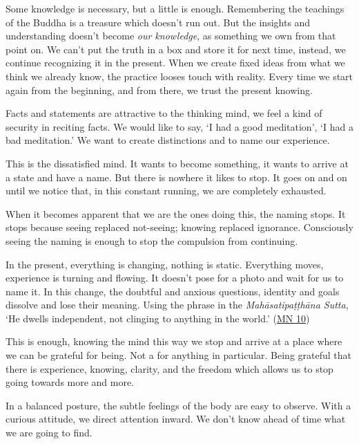 
Some knowledge is necessary, but a little is enough. Remembering the
teachings of the Buddha is a treasure which doesn't run out. But the
insights and understanding doesn't become \emph{our knowledge}, as
something we own from that point on. We can't put the truth in a box and
store it for next time, instead, we continue recognizing it in the
present. When we create fixed ideas from what we think we already know,
the practice looses touch with reality. Every time we start again from
the beginning, and from there, we trust the present knowing.

Facts and statements are attractive to the thinking mind, we feel a kind
of security in reciting facts. We would like to say, `I had a good
meditation', `I had a bad meditation.' We want to create distinctions
and to name our experience.

This is the dissatisfied mind. It wants to become something, it wants to
arrive at a state and have a name. But there is nowhere it likes to
stop. It goes on and on until we notice that, in this constant running,
we are completely exhausted.

When it becomes apparent that we are the ones doing this, the naming
stops. It stops because seeing replaced not-seeing; knowing replaced
ignorance. Consciously seeing the naming is enough to stop the
compulsion from continuing.

In the present, everything is changing, nothing is static. Everything
moves, experience is turning and flowing. It doesn't pose for a photo
and wait for us to name it. In this change, the doubtful and anxious
questions, identity and goals dissolve and lose their meaning. Using the
phrase in the \emph{Mahāsatipaṭṭhāna Sutta}, `He dwells independent, not
clinging to anything in the world.'
(\href{https://suttacentral.net/mn10}{MN 10})

This is enough, knowing the mind this way we stop and arrive at a place
where we can be grateful for being. Not a for anything in particular.
Being grateful that there is experience, knowing, clarity, and the
freedom which allows us to stop going towards more and more.


In a balanced posture, the subtle feelings of the body are easy to
observe. With a curious attitude, we direct attention inward. We don't
know ahead of time what we are going to find.


